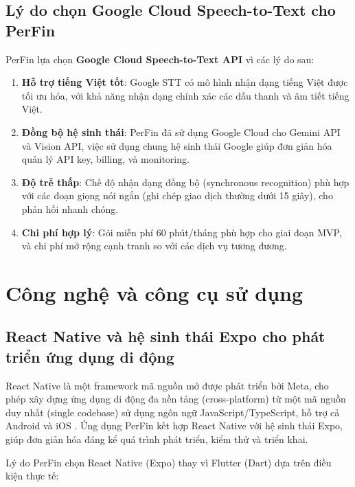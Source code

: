 \subsection{Lý do chọn Google Cloud Speech-to-Text cho PerFin}
\label{subsec:stt_choice}

PerFin lựa chọn \textbf{Google Cloud Speech-to-Text API} vì các lý do sau:

\begin{enumerate}
    \item \textbf{Hỗ trợ tiếng Việt tốt}: Google STT có mô hình nhận dạng tiếng Việt được tối ưu hóa, với khả năng nhận dạng chính xác các dấu thanh và âm tiết tiếng Việt.
    \item \textbf{Đồng bộ hệ sinh thái}: PerFin đã sử dụng Google Cloud cho Gemini API và Vision API, việc sử dụng chung hệ sinh thái Google giúp đơn giản hóa quản lý API key, billing, và monitoring.
    \item \textbf{Độ trễ thấp}: Chế độ nhận dạng đồng bộ (synchronous recognition) phù hợp với các đoạn giọng nói ngắn (ghi chép giao dịch thường dưới 15 giây), cho phản hồi nhanh chóng.
    \item \textbf{Chi phí hợp lý}: Gói miễn phí 60 phút/tháng phù hợp cho giai đoạn MVP, và chi phí mở rộng cạnh tranh so với các dịch vụ tương đương.
\end{enumerate}

\section{Công nghệ và công cụ sử dụng}
\label{sec:technology_stack}

\subsection{React Native và hệ sinh thái Expo cho phát triển ứng dụng di động}
\label{subsec:react_native_expo}

React Native là một framework mã nguồn mở được phát triển bởi Meta, cho phép xây dựng ứng dụng di động đa nền tảng (cross-platform) từ một mã nguồn duy nhất (single codebase) sử dụng ngôn ngữ JavaScript/TypeScript, hỗ trợ cả Android và iOS \cite{reactnative2024}. Ứng dụng PerFin kết hợp React Native với hệ sinh thái Expo, giúp đơn giản hóa đáng kể quá trình phát triển, kiểm thử và triển khai.

Lý do PerFin chọn React Native (Expo) thay vì Flutter (Dart) dựa trên điều kiện thực tế:

